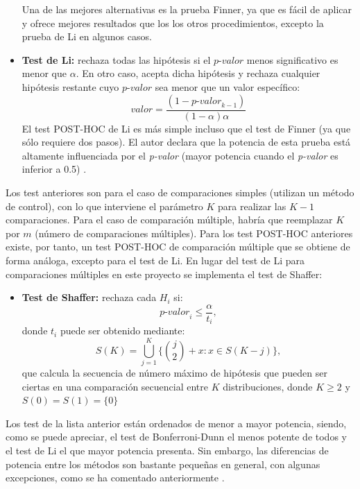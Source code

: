 \begin{itemize}
Una de las mejores alternativas es la prueba Finner, ya que es fácil de aplicar y ofrece mejores resultados que los los otros procedimientos, excepto la prueba de Li en algunos casos.
\item \textbf{Test de Li:} rechaza todas las hipótesis si el $\textit{p-valor}$ menos significativo es menor que  $\alpha$.
En otro caso, acepta dicha hipótesis y rechaza cualquier hipótesis restante cuyo $\textit{p-valor}$ sea menor que un valor
específico:
\[ valor = \frac{(1-\textit{p-valor}_{k-1})}{(1-\alpha)\alpha} \]
El test POST-HOC de Li es más simple incluso que el test de Finner (ya que sólo requiere dos pasos). El autor declara que la potencia de esta prueba está altamente influenciada por el \textit{p-valor} (mayor potencia cuando el \textit{p-valor} es inferior a 0.5) \cite{potencia}.
\end{itemize}

Los test anteriores son para el caso de comparaciones simples (utilizan un método de control), con lo que
interviene el parámetro $K$ para realizar las $K-1$ comparaciones. Para el caso de comparación múltiple, habría
que reemplazar $K$ por $m$ (número de comparaciones múltiples). Para los test POST-HOC anteriores existe, por
tanto, un test POST-HOC de comparación múltiple que se obtiene de forma análoga, excepto para el test de Li. En
lugar del test de Li para comparaciones múltiples en este proyecto se implementa el test de Shaffer:

\begin{itemize}
\item \textbf{Test de Shaffer:} rechaza cada $H_i$ si:
\[ \textit{p-valor}_{i} \leq \frac{\alpha}{t_i}, \]
donde $t_i$ puede ser obtenido mediante:
\[ S(K) = \bigcup_{j=1}^{K} \{{j \choose 2}  + x: x \in S(K-j)\}, \]
que calcula la secuencia de número máximo de hipótesis que pueden ser ciertas en una comparación secuencial
entre $K$ distribuciones, donde $K \geq 2$ y $S(0) = S(1) = \{0\}$
\end{itemize}

Los test de la lista anterior están ordenados de menor a mayor potencia, siendo, como se puede apreciar,
el test de Bonferroni-Dunn el menos potente de todos y el test de Li el que mayor potencia presenta. Sin embargo, las diferencias de potencia entre los métodos son bastante pequeñas en general, con algunas excepciones, como se ha comentado anteriormente \cite{potencia}.


